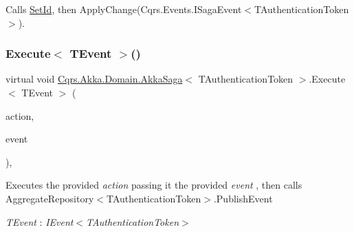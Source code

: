 Calls \hyperlink{classCqrs_1_1Akka_1_1Domain_1_1AkkaSaga_a3f3cf1a10203a1eead599e7529d41613_a3f3cf1a10203a1eead599e7529d41613}{Set\+Id}, then Apply\+Change(\+Cqrs.\+Events.\+I\+Saga\+Event$<$\+T\+Authentication\+Token$>$). 

\mbox{\label{classCqrs_1_1Akka_1_1Domain_1_1AkkaSaga_ac0782ac0b7e28418a52cead1b7b8b0c3_ac0782ac0b7e28418a52cead1b7b8b0c3}} 
\subsubsection{\texorpdfstring{Execute$<$ T\+Event $>$()}{Execute< TEvent >()}}
{\footnotesize\ttfamily virtual void \hyperlink{classCqrs_1_1Akka_1_1Domain_1_1AkkaSaga}{Cqrs.\+Akka.\+Domain.\+Akka\+Saga}$<$ T\+Authentication\+Token $>$.Execute$<$ T\+Event $>$ (\begin{DoxyParamCaption}\item[{Action$<$ T\+Event $>$}]{action,  }\item[{T\+Event @}]{event }\end{DoxyParamCaption})\hspace{0.3cm}{\ttfamily [protected]}, {\ttfamily [virtual]}}



Executes the provided {\itshape action}  passing it the provided {\itshape event} , then calls Aggregate\+Repository$<$\+T\+Authentication\+Token$>$.\+Publish\+Event 

\begin{Desc}
\item[Type Constraints]\begin{description}
\item[{\em T\+Event} : {\em I\+Event$<$T\+Authentication\+Token$>$}]\end{description}
\end{Desc}
\mbox{\label{classCqrs_1_1Akka_1_1Domain_1_1AkkaSaga_ac88061e29e3e2223db31ce9075835b46_ac88061e29e3e2223db31ce9075835b46}} 

